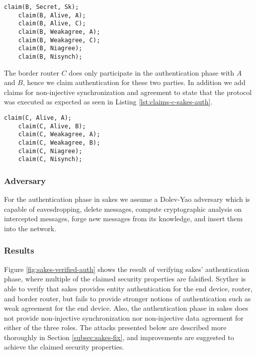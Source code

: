 \begin{lstlisting}[caption={Security claims for role B during the authentication phase in SAKES.}, label={lst:claims-b-sakes-auth}]
	claim(B, Secret, Sk);
	claim(B, Alive, A);
	claim(B, Alive, C);
	claim(B, Weakagree, A);
	claim(B, Weakagree, C);
	claim(B, Niagree);
	claim(B, Nisynch);
\end{lstlisting}

The border router $C$ does only participate in the authentication phase with $A$ and $B$, hence we claim authentication for these two parties. In addition we add claims for non-injective synchronization and agreement to state that the protocol was executed as expected as seen in Listing \ref{lst:claims-c-sakes-auth}.\\

\begin{lstlisting}[caption={Security claims for role C during key establishment in SAKES.}, label={lst:claims-c-sakes-auth}]
	claim(C, Alive, A);
	claim(C, Alive, B);
	claim(C, Weakagree, A);
	claim(C, Weakagree, B);
	claim(C, Niagree);
	claim(C, Nisynch);
\end{lstlisting}

\subsubsection{Adversary}

For the authentication phase in \gls{sakes} we assume a Dolev-Yao adversary which is capable of eavesdropping, delete messages, compute cryptographic analysis on intercepted messages, forge new messages from its knowledge, and insert them into the network. 

\subsubsection{Results}

Figure \ref{fig:sakes-verified-auth} shows the result of verifying \gls{sakes}' authentication phase, where multiple of the claimed security properties are falsified. Scyther is able to verify that \gls{sakes} provides entity authentication for the end device, router, and border router, but fails to provide stronger notions of authentication such as weak agreement for the end device. Also, the authentication phase in \gls{sakes} does not provide non-injective synchronization nor non-injective data agreement for either of the three roles. The attacks presented below are described more thoroughly in Section \ref{subsec:sakes-fix}, and improvements are suggested to achieve the claimed security properties.

